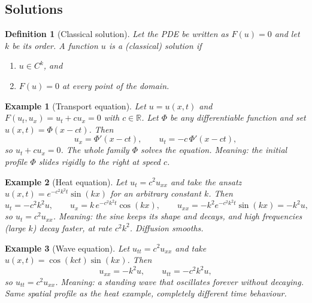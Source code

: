\documentclass{article}
\newtheorem{definition}{Definition}
\newtheorem*{example}{Example}
\begin{document}
\subsection{Solutions}
\begin{definition}[Classical solution]
    Let the PDE be written as $F(u) = 0$ and let $k$ be its order. A function $u$ is a (classical) solution if
    \begin{enumerate}[label=(\arabic*)]
        \item $u \in C^k$, and
        \item $F(u) = 0$ at every point of the domain.
    \end{enumerate}
\end{definition}
\begin{example}[Transport equation]
    Let $u = u(x,t)$ and $F(u_t, u_x) = u_t + c u_x = 0$ with $c \in \mathbb{R}$. Let $\Phi$ be any differentiable function and set $u(x,t) = \Phi(x - ct)$. Then
    \begin{equation}
        u_x = \Phi'(x-ct), \qquad u_t = -c\,\Phi'(x-ct),
    \end{equation}
    so $u_t + c u_x = 0$. The whole family $\Phi$ solves the equation. Meaning: the initial profile $\Phi$ slides rigidly to the right at speed $c$.
\end{example}
\begin{example}[Heat equation]
    Let $u_t = c^2 u_{xx}$ and take the ansatz $u(x,t) = e^{-c^2k^2 t}\sin(kx)$ for an arbitrary constant $k$. Then
    \begin{equation}
        u_t = -c^2k^2 u, \qquad
        u_x = k\,e^{-c^2k^2t}\cos(kx), \qquad
        u_{xx} = -k^2 e^{-c^2k^2t}\sin(kx) = -k^2 u,
    \end{equation}
    so $u_t = c^2 u_{xx}$. Meaning: the sine keeps its shape and decays, and high frequencies (large $k$) decay faster, at rate $c^2k^2$. Diffusion smooths.
\end{example}
\begin{example}[Wave equation]
    Let $u_{tt} = c^2 u_{xx}$ and take $u(x,t) = \cos(kct)\sin(kx)$. Then
    \begin{equation}
        u_{xx} = -k^2 u, \qquad u_{tt} = -c^2k^2 u,
    \end{equation}
    so $u_{tt} = c^2 u_{xx}$. Meaning: a standing wave that oscillates forever without decaying. Same spatial profile as the heat example, completely different time behaviour.
\end{example}
\end{document}
